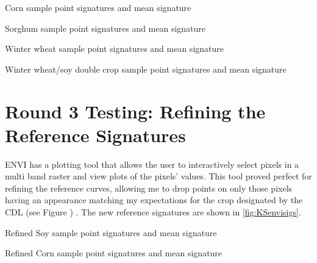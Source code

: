 \begin{ssfigure}
  \centering
  
  \caption{Corn sample point signatures and mean signature}
    \label{fig:KScornfirstsigs}
\end{ssfigure}

\begin{ssfigure}
  \centering
  
  \caption{Sorghum sample point signatures and mean signature}
    \label{fig:KSsorghumfirstsigs}
\end{ssfigure}

\begin{ssfigure}
  \centering
  
  \caption{Winter wheat sample point signatures and mean signature}
    \label{fig:KSwheatfirstsigs}
\end{ssfigure}

\begin{ssfigure}
  \centering
  
  \caption{Winter wheat/soy double crop sample point signatures and mean signature}
    \label{fig:KSwheatsoyfirstsigs}
\end{ssfigure}


\section{Round 3 Testing: Refining the Reference Signatures}
\label{appendix:testing:r3}

ENVI has a plotting tool that allows the user to interactively select pixels in a multi band raster and view plots of the pixels’ values. This tool proved perfect for refining the reference curves, allowing me to drop points on only those pixels having an appearance matching my expectations for the crop designated by the CDL (see Figure )
. The new reference signatures are shown in \autoref{fig:KSenvisigs}.


\begin{ssfigure}
  \centering
  
  \caption{Refined Soy sample point signatures and mean signature}
    \label{fig:KSsoyrefinedsigs}
\end{ssfigure}

\begin{ssfigure}
  \centering
  
  \caption{Refined Corn sample point signatures and mean signature}
    \label{fig:KScornrefinedsigs}
\end{ssfigure}

